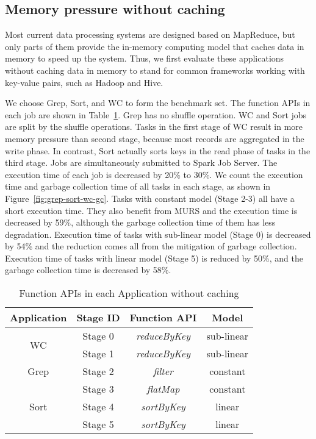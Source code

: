 \subsection{Memory pressure without caching}

Most current data processing systems are designed based on MapReduce, but only parts of them provide the in-memory computing model that caches data in memory to speed up the system. Thus, we first evaluate these applications without caching data in memory to stand for common frameworks working with key-value pairs, such as Hadoop and Hive.

We choose Grep, Sort, and WC to form the benchmark set. The function APIs in each job are shown in Table~\ref{table:grep-sort-wc}. Grep has no shuffle operation. WC and Sort jobs are split by the shuffle operations. Tasks in the first stage of WC result in more memory pressure than second stage, because most records are aggregated in the write phase. In contrast, Sort actually sorts keys in the read phase of tasks in the third stage. Jobs are simultaneously submitted to Spark Job Server. The execution time of each job is decreased by 20\% to 30\%. We count the execution time and garbage collection time of all tasks in each stage, as shown in Figure~\ref{fig:grep-sort-wc-gc}. Tasks with constant model (Stage 2-3) all have a short execution time. They also benefit from MURS and the execution time is decreased by 59\%, although the garbage collection time of them has less degradation. Execution time of tasks with sub-linear model (Stage 0) is decreased by 54\% and the reduction comes all from the mitigation of garbage collection. Execution time of tasks with linear model (Stage 5) is reduced by 50\%, and the garbage collection time is decreased by 58\%.

\begin{table}[!t]
\small
\centering
\caption{Function APIs in each Application without caching}
\begin{tabular}{ c | c | c | c }

\hline
\textbf{Application} & \textbf{Stage ID} & \textbf{Function API} & \textbf{Model}\\
\hline
\multirow{2}{*}{WC} & Stage 0 & \textit{reduceByKey} & sub-linear  \\
\cline{2-4}
 & Stage 1 & \textit{reduceByKey} & sub-linear \\
\hline
Grep & Stage 2 & \textit{filter} & constant \\
\hline
\multirow{3}{*}{Sort} & Stage 3 & \textit{flatMap} & constant \\
\cline{2-4}
 & Stage 4 & \textit{sortByKey} & linear \\
\cline{2-4}
 & Stage 5 & \textit{sortByKey} & linear \\
\hline

\hline
\end{tabular}
\label{table:grep-sort-wc}
\end{table}


